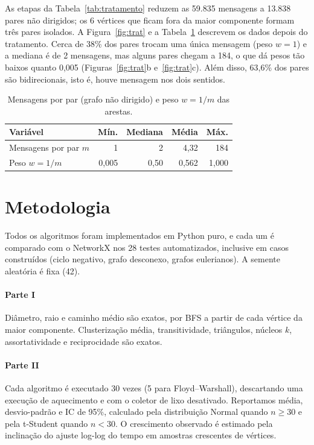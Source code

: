 \documentclass[sigconf]{webmedia}
\newcommand{\nMensagens}{59.835}
\newcommand{\nArestasND}{13.838}
\begin{document}
As etapas da Tabela~\ref{tab:tratamento} reduzem as \nMensagens{} mensagens a \nArestasND{} pares não dirigidos; os 6 vértices que ficam fora da maior componente formam três pares isolados. A Figura~\ref{fig:trat} e a Tabela~\ref{tab:pesos} descrevem os dados depois do tratamento. Cerca de 38\% dos pares trocam uma única mensagem (peso $w=1$) e a mediana é de 2 mensagens, mas alguns pares chegam a 184, o que dá pesos tão baixos quanto 0,005 (Figuras~\ref{fig:trat}b e~\ref{fig:trat}c). Além disso, 63,6\% dos pares são bidirecionais, isto é, houve mensagem nos dois sentidos.

\begin{table}[t]
  \caption{Mensagens por par (grafo não dirigido) e peso $w=1/m$ das arestas.}
  \label{tab:pesos}
  \small
  \setlength{\tabcolsep}{4pt}
  \begin{tabular}{lrrrr}
    \toprule
    Variável & Mín. & Mediana & Média & Máx. \\
    \midrule
    Mensagens por par $m$ & 1 & 2 & 4,32 & 184 \\
    Peso $w=1/m$ & 0,005 & 0,50 & 0,562 & 1,000 \\
    \bottomrule
  \end{tabular}
\end{table}

\FloatBarrier
\section{Metodologia}
Todos os algoritmos foram implementados em Python puro, e cada um é comparado com o NetworkX nos 28 testes automatizados, inclusive em casos construídos (ciclo negativo, grafo desconexo, grafos eulerianos). A semente aleatória é fixa (42).

\paragraph{Parte I} Diâmetro, raio e caminho médio são exatos, por BFS a partir de cada vértice da maior componente. Clusterização média, transitividade, triângulos, núcleos $k$, assortatividade e reciprocidade são exatos.

\paragraph{Parte II} Cada algoritmo é executado 30 vezes (5 para Floyd--Warshall), descartando uma execução de aquecimento e com o coletor de lixo desativado. Reportamos média, desvio-padrão e IC de 95\%, calculado pela distribuição Normal quando $n\ge30$ e pela t-Student quando $n<30$. O crescimento observado é estimado pela inclinação do ajuste log-log do tempo em amostras crescentes de vértices.
\end{document}
